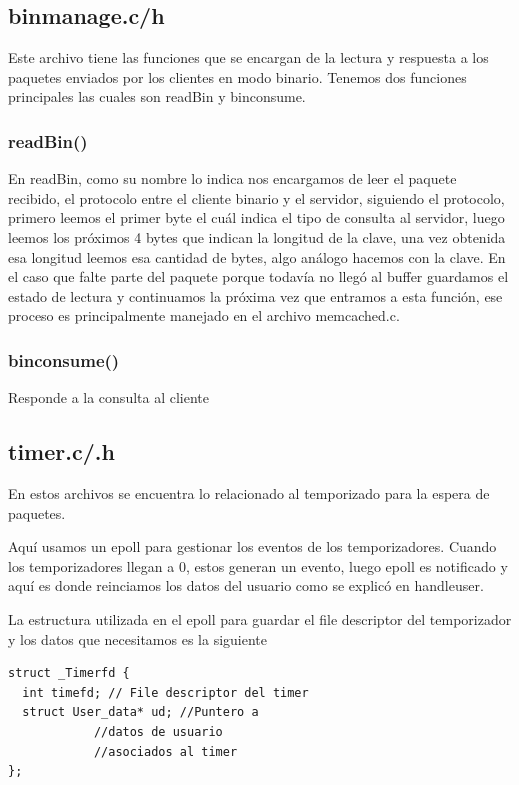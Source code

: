 \documentclass{article}
\begin{document}
\subsection{bin\textunderscore manage.c/h}\label{sec:bin}
Este archivo tiene las funciones que se encargan de la lectura
y respuesta a los paquetes enviados por los clientes en modo
binario. Tenemos dos funciones principales las cuales son
readBin y bin\textunderscore consume.

\subsubsection{readBin()}
En readBin, como su nombre lo indica nos encargamos de leer
el paquete recibido, el protocolo entre el cliente binario
y el servidor, siguiendo el protocolo, primero leemos el primer
byte el cuál indica el tipo de consulta al servidor, luego
leemos los próximos 4 bytes que indican la longitud de la clave,
una vez obtenida esa longitud leemos esa cantidad de bytes, algo
análogo hacemos con la clave. En el caso que falte parte del
paquete porque todavía no llegó al buffer guardamos el estado
de lectura y continuamos la próxima vez que entramos a esta
función, ese proceso es principalmente manejado en el archivo
memcached.c.

\subsubsection{bin\textunderscore consume()}
Responde a la consulta al cliente

\subsection{timer.c/.h}
En estos archivos se encuentra lo relacionado al temporizado
para la espera de paquetes.

Aquí usamos un epoll para gestionar los eventos de los
temporizadores. Cuando los temporizadores llegan a
0, estos generan un evento, luego epoll es notificado
y aquí es donde reinciamos los datos del usuario como
se explicó en handle\textunderscore user.

La estructura utilizada en el epoll para guardar el
file descriptor del temporizador y los datos que
necesitamos es la siguiente

\begin{lstlisting}[style=CStyle]
struct _Timerfd {
  int timefd; // File descriptor del timer
  struct User_data* ud; //Puntero a 
			//datos de usuario
		 	//asociados al timer
};
\end{lstlisting}
\end{document}
